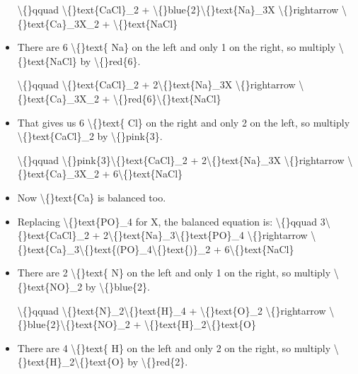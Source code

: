 \documentclass{article}
\begin{document}
\begin{itemize}
                    \textbackslash\{\}qquad
                        \textbackslash\{\}text\{CaCl\}\_2 + \textbackslash\{\}blue\{2\}\textbackslash\{\}text\{Na\}\_3X \textbackslash\{\}rightarrow \textbackslash\{\}text\{Ca\}\_3X\_2 + \textbackslash\{\}text\{NaCl\}
  \item There are 6 \textbackslash\{\}text\{ Na\} on the left and only
                        1 on the right, so multiply
                        \textbackslash\{\}text\{NaCl\} by \textbackslash\{\}red\{6\}.
                    
                    \textbackslash\{\}qquad
                        \textbackslash\{\}text\{CaCl\}\_2 + 2\textbackslash\{\}text\{Na\}\_3X \textbackslash\{\}rightarrow \textbackslash\{\}text\{Ca\}\_3X\_2 + \textbackslash\{\}red\{6\}\textbackslash\{\}text\{NaCl\}
  \item That gives us 6 \textbackslash\{\}text\{ Cl\} on the right and
                        only 2 on the left, so multiply
                        \textbackslash\{\}text\{CaCl\}\_2 by \textbackslash\{\}pink\{3\}.
                    
                    \textbackslash\{\}qquad
                        \textbackslash\{\}pink\{3\}\textbackslash\{\}text\{CaCl\}\_2 + 2\textbackslash\{\}text\{Na\}\_3X \textbackslash\{\}rightarrow \textbackslash\{\}text\{Ca\}\_3X\_2 + 6\textbackslash\{\}text\{NaCl\}
  \item Now \textbackslash\{\}text\{Ca\} is balanced too.
  \item Replacing \textbackslash\{\}text\{PO\}\_4 for X, the balanced equation is:
                    \textbackslash\{\}qquad
                        3\textbackslash\{\}text\{CaCl\}\_2 + 2\textbackslash\{\}text\{Na\}\_3\textbackslash\{\}text\{PO\}\_4 \textbackslash\{\}rightarrow \textbackslash\{\}text\{Ca\}\_3\textbackslash\{\}text\{(PO\}\_4\textbackslash\{\}text\{)\}\_2 + 6\textbackslash\{\}text\{NaCl\}
  \item There are 2 \textbackslash\{\}text\{ N\} on the left and
                        only 1 on the right, so multiply
                        \textbackslash\{\}text\{NO\}\_2 by \textbackslash\{\}blue\{2\}.
                    
                    \textbackslash\{\}qquad
                        \textbackslash\{\}text\{N\}\_2\textbackslash\{\}text\{H\}\_4 + \textbackslash\{\}text\{O\}\_2 \textbackslash\{\}rightarrow \textbackslash\{\}blue\{2\}\textbackslash\{\}text\{NO\}\_2 + \textbackslash\{\}text\{H\}\_2\textbackslash\{\}text\{O\}
  \item There are 4 \textbackslash\{\}text\{ H\} on the left and
                        only 2 on the right, so multiply
                        \textbackslash\{\}text\{H\}\_2\textbackslash\{\}text\{O\} by \textbackslash\{\}red\{2\}.
                    

\end{itemize}
\end{document}
